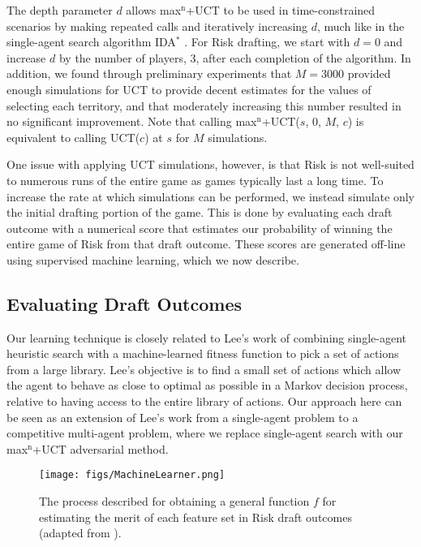 \documentclass[letterpaper]{article}
\numberwithin{equation}{section}
\numberwithin{theorem}{section}
\numberwithin{lemma}{section}
\numberwithin{df}{section}
\begin{document}
The depth parameter $d$ allows max$^\text{n}$+UCT to be used in time-constrained scenarios by making repeated calls and iteratively increasing $d$, much like in the single-agent search algorithm IDA$^*$ \cite{IdaStar}.  For Risk drafting, we start with $d = 0$ and increase $d$ by the number of players, 3, after each completion of the algorithm.  In addition, we found through preliminary experiments that $M = 3000$ provided enough simulations for UCT to provide decent estimates for the values of selecting each territory, and that moderately increasing this number resulted in no significant improvement.  Note that calling max$^\text{n}$+UCT($s$, $0$, $M$, $c$) is equivalent to calling UCT($c$) at $s$ for $M$ simulations.  

One issue with applying UCT simulations, however, is that Risk is not well-suited to numerous runs of the entire game as games typically last a long time.  To increase the rate at which simulations can be performed, we instead simulate only the initial drafting portion of the game.  This is done by evaluating each draft outcome with a numerical score that estimates our probability of winning the entire game of Risk from that draft outcome.  These scores are generated off-line using supervised machine learning, which we now describe.

\subsection{Evaluating Draft Outcomes}

Our learning technique is closely related to Lee's work \cite{GregLeeThesis} of combining single-agent heuristic search with a machine-learned fitness function to pick a set of actions from a large library.  Lee's objective is to find a small set of actions which allow the agent to behave as close to optimal as possible in a Markov decision process, relative to having access to the entire library of actions.  Our approach here can be seen as an extension of Lee's work from a single-agent problem to a competitive multi-agent problem, where we replace single-agent search with our max$^\text{n}$+UCT adversarial method. 

\begin{figure*}[t]
	\centering
	\texttt{[image: figs/MachineLearner.png]}
	\caption{The process described for obtaining a general function $f$ for estimating the merit of each feature set in Risk draft outcomes (adapted from \cite[Figure 5.1]{GregLeeThesis}).}
	\label{fig:MachLearn}
\end{figure*} 
\end{document}
